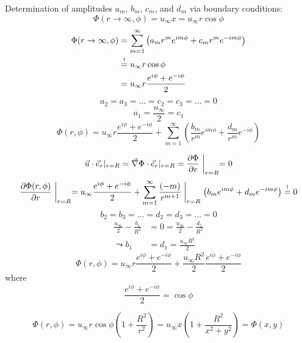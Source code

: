 Determination of amplitudes $a_m$, $b_m$, $c_m$, and $d_m$ via boundary conditions:
\begin{equation}
\Phi(r\rightarrow\infty, \phi) = u_\infty x = u_\infty r\cos\phi
\end{equation}
\begin{align}
\Phi(r\rightarrow\infty,\phi) &= \sum_{m=1}^\infty \left(a_mr^me^{im\phi}+c_mr^me^{-im\phi}\right)\\
&\overset{!}{=} u_\infty r\cos\phi\\
&= u_\infty r\frac{e^{i\phi}+e^{-i\phi}}{2}
\end{align}
\begin{equation}
a_2=a_3=\dots=c_2=c_3=\dots=0
\end{equation}
\begin{equation}
a_1=\frac{u_\infty}{2}=c_1
\end{equation}
\begin{equation}
\Phi(r,\phi)=u_\infty r \frac{e^{i\phi}+e^{-i\phi}}{2} + \sum_{m=1}^\infty \left(\frac{b_m}{r^m}e^{im\phi}+\frac{d_m}{r^m}e^{-i\phi}\right)
\end{equation}

\begin{equation}
\vec{u}\cdot \vec{e}_r |_{r=R} = \vec{\nabla}\Phi\cdot\vec{e}_r|_{r=R} = \frac{\partial \Phi}{\partial r}\biggm\vert_{r=R}=0
\end{equation}
\begin{equation}
\frac{\partial \Phi(r,\phi)}{\partial r}\biggm\vert_{r=R} = u_\infty\frac{e^{i\phi}+e^{-i\phi}}{2} + \sum_{m=1}^\infty \frac{(-m)}{r^{m+1}}\biggm\vert_{r=R}\left(b_me^{im\phi}+d_me^{-im\phi}\right) \overset{!}{=} 0
\end{equation}
\begin{equation}
b_2=b_3=\dots=d_2=d_3=\dots=0
\end{equation}
\begin{align}
\frac{u_\infty}{2}-\frac{b_1}{R^2} &= 0 = \frac{u_\infty}{2}-\frac{d_1}{R^2}\\
\leadsto
b_1&=d_1 = \frac{u_\infty R^2}{2}
\end{align}
\begin{equation}
\Phi(r,\phi) = u_\infty r \frac{e^{i\phi}+e^{-i\phi}}{2} + \frac{u_\infty R^2}{2}\frac{e^{i\phi}+e^{-i\phi}}{2}
\end{equation}
where
\begin{equation}
\frac{e^{i\phi}+e^{-i\phi}}{2} = \cos\phi
\end{equation}

\begin{equation}
\Phi(r,\phi) = u_\infty r \cos \phi \left(1+\frac{R^2}{r^2}\right) = u_\infty x \left(1+\frac{R^2}{x^2+y^2}\right) = \Phi(x,y)
\end{equation}
